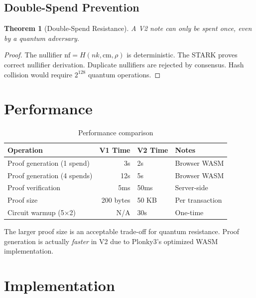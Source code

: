 \documentclass[11pt,a4paper]{article}
\newtheorem{theorem}{Theorem}
\begin{document}
\subsection{Double-Spend Prevention}

\begin{theorem}[Double-Spend Resistance]
A V2 note can only be spent once, even by a quantum adversary.
\end{theorem}

\begin{proof}
The nullifier $\text{nf} = H(nk, \text{cm}, \rho)$ is deterministic. The STARK proves correct nullifier derivation. Duplicate nullifiers are rejected by consensus. Hash collision would require $2^{128}$ quantum operations.
\end{proof}

\section{Performance}

\begin{table}[h]
\centering
\begin{tabular}{lrll}
\toprule
Operation & V1 Time & V2 Time & Notes \\
\midrule
Proof generation (1 spend) & 3s & 2s & Browser WASM \\
Proof generation (4 spends) & 12s & 5s & Browser WASM \\
Proof verification & 5ms & 50ms & Server-side \\
Proof size & 200 bytes & 50 KB & Per transaction \\
Circuit warmup (5$\times$2) & N/A & 30s & One-time \\
\bottomrule
\end{tabular}
\caption{Performance comparison}
\end{table}

The larger proof size is an acceptable trade-off for quantum resistance. Proof generation is actually \textit{faster} in V2 due to Plonky3's optimized WASM implementation.

\section{Implementation}
\end{document}
